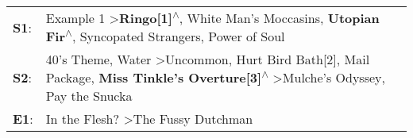 \begin{supertabular}{p{0.03\textwidth}p{0.92\textwidth}}
 \textbf{S1}:  &                                                                                Example 1\textsuperscript{} \textgreater \enspace \textbf{Ringo[1]\textsuperscript{$\wedge$}}, \enspace White Man's Moccasins\textsuperscript{}, \enspace \textbf{Utopian Fir\textsuperscript{$\wedge$}}, \enspace Syncopated Strangers\textsuperscript{}, \enspace Power of Soul\textsuperscript{}  \enspace  \\
 \textbf{S2}:  &  40's Theme\textsuperscript{}, \enspace Water\textsuperscript{} \textgreater \enspace Uncommon\textsuperscript{}, \enspace Hurt Bird Bath[2]\textsuperscript{}, \enspace Mail Package\textsuperscript{}, \enspace \textbf{Miss Tinkle's Overture[3]\textsuperscript{$\wedge$}} \textgreater \enspace Mulche's Odyssey\textsuperscript{}, \enspace Pay the Snucka\textsuperscript{}  \enspace  \\
 \textbf{E1}:  &                                                                                                                                                                                                                                                                                         In the Flesh?\textsuperscript{} \textgreater \enspace The Fussy Dutchman\textsuperscript{}  \enspace  \\
\end{supertabular}
